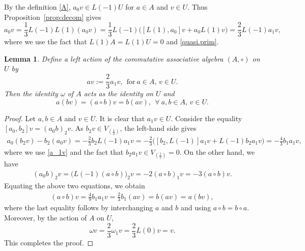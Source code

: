 \documentclass[12pt]{article}
\numberwithin{equation}{section}
\newtheorem{lemma}[theorem]{Lemma}
\theoremstyle{definition}
\theoremstyle{plain}
\begin{document}
By the definition \eqref{A}, $a_0v\in L(-1)U$ for $a\in A$ and $v\in U$. Thus Proposition~\ref{prop:decom} gives
\begin{equation}\label{a_1v}
    a_0v=\frac{1}{3}L(-1)L(1)(a_0v)=\frac{1}{3}L(-1)\big([L(1),a_0]v+a_0L(1)v\big)=\frac{2}{3}L(-1)a_1v,
\end{equation}
where we use the fact that $L(1)A=L(1)U=0$ and \eqref{quasi.prim}.

\begin{lemma}
    Define a left action of the commutative associative algebra $(A,\circ)$ on $U$ by
    \begin{equation*}
        av:=\frac{2}{3}a_1v,\ \ \text{for}\ a\in A,\, v\in U.
    \end{equation*}
    Then the identity $\omega$ of $A$ acts as the identity on $U$ and
    \begin{equation*}
        a(bv)=(a\circ b)v=b(av),\ \ \forall\ a,b\in A,\, v\in U.
    \end{equation*}
\end{lemma}
\begin{proof}
    Let $a,b\in A$ and $v\in U$. It is clear that $a_1v\in U$. Consider the equality $[a_0,b_2]v=(a_0b)_2v$. As $b_2v\in V_{(\frac{1}{2})}$, the left-hand side gives
    \begin{align*}
        a_0(b_2v)-b_2(a_0v)=-\frac{2}{3}b_2L(-1)a_1v=-\frac{2}{3}\big([b_2,L(-1)]a_1v+L(-1)b_2a_1v\big)=-\frac{4}{3}b_1a_1v,
    \end{align*}
    where we use \eqref{a_1v} and the fact that $b_2a_1v\in V_{(\frac{1}{2})}=0$. On the other hand, we have
    \begin{align*}
        (a_0b)_2v=\big(L(-1)(a\circ b)\big)_2v=-2(a\circ b)_1v=-3(a\circ b)v.
    \end{align*}
    Equating the above two equations, we obtain
    \begin{align*}
        (a\circ b)v=\frac{4}{9}b_1a_1v=\frac{2}{3}b_1(av)=b(av)=a(bv),
    \end{align*}
    where the last equality follows by interchanging $a$ and $b$ and using $a\circ b=b\circ a$. Moreover, by the action of $A$ on $U$,
    \begin{equation*}
        \omega v=\frac{2}{3}\omega_1v=\frac{2}{3}L(0)v=v.
    \end{equation*}
    This completes the proof.
\end{proof}
\end{document}
